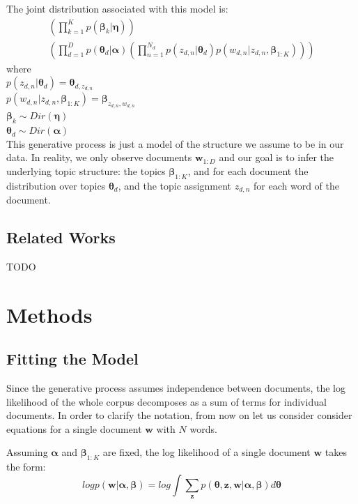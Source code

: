 \documentclass{article}
\begin{document}
The joint distribution associated with this model is:
\begin{multline} 
	\label{joint}
	(\prod_{k=1}^{K} p(\bm{\beta}_k | \bm{\eta})) \\
	(\prod_{d=1}^{D} p(\bm{\theta}_d | \bm{\alpha})
	(\prod_{n=1}^{N_d} p(z_{d,n} | \bm{\theta}_d) p(w_{d,n} | z_{d,n}, \bm{\beta}_{1:K})))
\end{multline}
where \\
$p(z_{d,n} | \bm{\theta}_d) = \bm{\theta}_{d, z_{d,n}}$ \\
$p(w_{d,n} | z_{d,n}, \bm{\beta}_{1:K}) = \bm{\beta}_{z_{d,n},w_{d,n}}$ \\
$\bm{\beta}_k \sim Dir(\bm{\eta})$ \\
$\bm{\theta}_d \sim Dir(\bm{\alpha})$ \\

This generative process is just a model of the structure we assume to be in our data. In reality, we only observe documents $\mathbf{w}_{1:D}$ and our goal is to infer the underlying topic structure: the topics $\bm{\beta}_{1:K}$, and for each document the distribution over topics $\bm{\theta}_{d}$, and the topic assignment $z_{d, n}$ for each word of the document. 

\subsection{Related Works}
TODO

\section{Methods}

\subsection{Fitting the Model}
Since the generative process assumes independence between documents, the log likelihood of the whole corpus decomposes as a sum of terms for individual documents. In order to clarify the notation, from now on let us consider consider equations for a single document $\mathbf{w}$ with $N$ words.

Assuming $\bm{\alpha}$ and $\bm{\beta}_{1:K}$ are fixed, the log likelihood of a single document $\mathbf{w}$ takes the form:
\begin{equation}
log p(\mathbf{w} | \bm{\alpha}, \bm{\beta}) =
	log \int \sum_{\mathbf{z}} p (\bm{\theta}, \mathbf{z}, \mathbf{w} | \bm{\alpha}, \bm{\beta}) d\bm{\theta} 
\end{equation}
\end{document}
